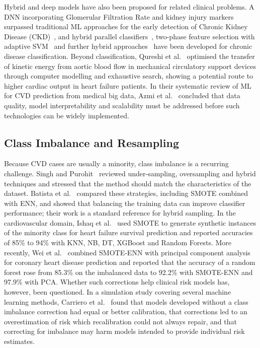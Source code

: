 \documentclass[11pt,a4paper]{article}
\begin{document}
Hybrid and deep models have also been proposed for related clinical
problems. A DNN incorporating Glomerular Filtration Rate and kidney injury
markers surpassed traditional ML approaches for the early detection of
Chronic Kidney Disease (CKD)~\cite{singh2022}, and hybrid parallel
classifiers~\cite{singhjain}, two-phase feature selection with adaptive
SVM~\cite{jain2019} and further hybrid approaches~\cite{jain2020} have been
developed for chronic disease classification. Beyond classification,
Qureshi et al.~\cite{qureshi} optimised the transfer of kinetic energy from
aortic blood flow in mechanical circulatory support devices through computer
modelling and exhaustive search, showing a potential route to higher
cardiac output in heart failure patients. In their systematic review of ML
for CVD prediction from medical big data, Azmi et al.~\cite{azmi} concluded
that data quality, model interpretability and scalability must be addressed
before such technologies can be widely implemented.

\subsection{Class Imbalance and Resampling}

Because CVD cases are usually a minority, class imbalance is a recurring
challenge. Singh and Purohit~\cite{singh2015} reviewed under-sampling,
oversampling and hybrid techniques and stressed that the method should match
the characteristics of the dataset. Batista et al.~\cite{batista} compared
these strategies, including SMOTE combined with ENN, and showed that
balancing the training data can improve classifier performance; their work
is a standard reference for hybrid sampling. In the cardiovascular domain,
Ishaq et al.~\cite{ishaq} used SMOTE to generate synthetic instances of the
minority class for heart failure survival prediction and reported accuracies
of 85\% to 94\% with KNN, NB, DT, XGBoost and Random Forests. More
recently, Wei et al.~\cite{wei2025} combined SMOTE-ENN with principal
component analysis for coronary heart disease prediction and reported that
the accuracy of a random forest rose from 85.3\% on the imbalanced data to
92.2\% with SMOTE-ENN and 97.9\% with PCA. Whether such corrections help
clinical risk models has, however, been questioned. In a simulation study
covering several machine learning methods, Carriero et
al.~\cite{carriero2025} found that models developed without a class
imbalance correction had equal or better calibration, that corrections led
to an overestimation of risk which recalibration could not always repair,
and that correcting for imbalance may harm models intended to provide
individual risk estimates.
\end{document}
